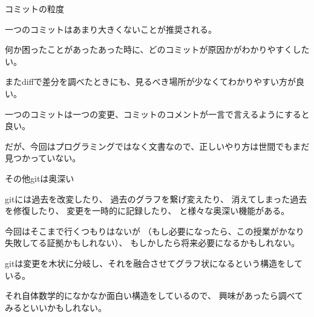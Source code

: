 \documentclass[12pt, unicode]{beamer}
\begin{document}
\begin{frame}{コミットの粒度}

一つのコミットはあまり大きくないことが推奨される。

何か困ったことがあったあった時に、どのコミットが原因かがわかりやすくしたい。

またdiffで差分を調べたときにも、見るべき場所が少なくてわかりやすい方が良い。

一つのコミットは一つの変更、コミットのコメントが一言で言えるようにすると良い。

だが、今回はプログラミングではなく文書なので、正しいやり方は世間でもまだ見つかっていない。

\end{frame}
\begin{frame}{その他gitは奥深い}

gitには過去を改変したり、
過去のグラフを繋げ変えたり、
消えてしまった過去を修復したり、
変更を一時的に記録したり、
と様々な奥深い機能がある。

今回はそこまで行くつもりはないが
（もし必要になったら、この授業がかなり失敗してる証拠かもしれない）、
もしかしたら将来必要になるかもしれない。

gitは変更を木状に分岐し、それを融合させてグラフ状になるという構造をしている。

それ自体数学的になかなか面白い構造をしているので、
興味があったら調べてみるといいかもしれない。

\end{frame}
\end{document}
